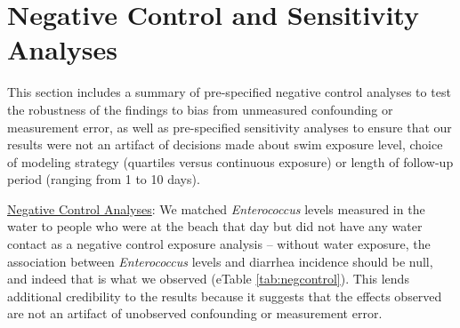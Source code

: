 \documentclass[12pt]{article}\usepackage[]{graphicx}\usepackage[]{color}
\begin{document}
\clearpage
\section{Negative Control and Sensitivity Analyses}

This section includes a summary of pre-specified negative control analyses to test the robustness of the findings to bias from unmeasured confounding or measurement error, as well as pre-specified sensitivity analyses to ensure that our results were not an artifact of decisions made about swim exposure level, choice of modeling strategy (quartiles versus continuous exposure) or length of follow-up period (ranging from 1 to 10 days).

\bigskip
\underline{Negative Control Analyses}: We matched \emph{Enterococcus} levels measured in the water to people who were at the beach that day but did not have any water contact as a negative control exposure analysis\supercite{Lipsitch2010-kq,Arnold2016-yr} -- without water exposure, the association between \emph{Enterococcus} levels and diarrhea incidence should be null, and indeed that is what we observed (eTable \ref{tab:negcontrol}). This lends additional credibility to the results because it suggests that the effects observed are not an artifact of unobserved confounding or measurement error.\supercite{Lipsitch2010-kq,Arnold2016-yr}
\end{document}

